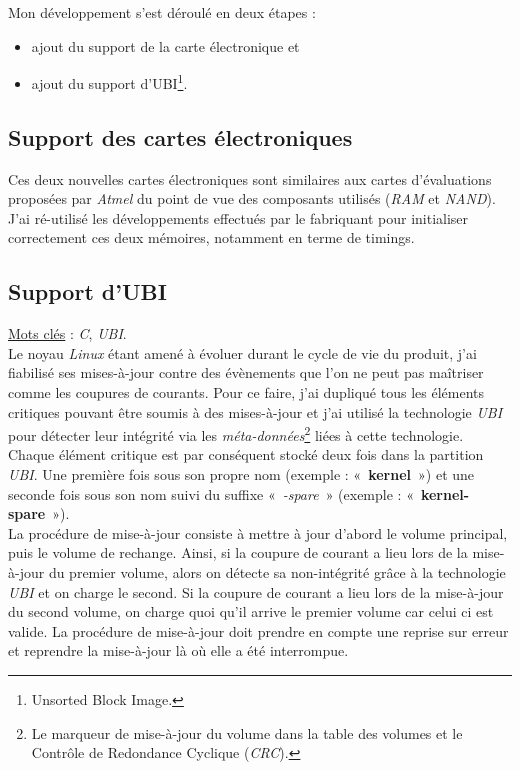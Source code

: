 \documentclass[a4paper]{article}
\begin{document}
Mon développement s'est déroulé en deux étapes :
\begin{itemize}
\item ajout du support de la carte électronique et
\item ajout du support d'UBI\footnote{Unsorted Block Image.}.
\end{itemize}

\subsection{Support des cartes électroniques}

Ces deux nouvelles cartes électroniques sont similaires aux cartes d'évaluations proposées par \textit{Atmel} du point de vue des composants utilisés (\textit{RAM} et \textit{NAND}). J'ai ré-utilisé les développements effectués par le fabriquant pour initialiser correctement ces deux mémoires, notamment en terme de timings.

\subsection{Support d'UBI}

\underline{Mots clés} : \textit{C}, \textit{UBI}.\\

Le noyau \textit{Linux} étant amené à évoluer durant le cycle de vie du produit, j'ai fiabilisé ses mises-à-jour contre des évènements que l'on ne peut pas maîtriser comme les coupures de courants. Pour ce faire, j'ai dupliqué tous les éléments critiques pouvant être soumis à des mises-à-jour et j'ai utilisé la technologie \textit{UBI} pour détecter leur intégrité via les \textit{méta-données}\footnote{Le marqueur de mise-à-jour du volume dans la table des volumes et le Contrôle de Redondance Cyclique (\textit{CRC}).} liées à cette technologie.\\

Chaque élément critique est par conséquent stocké deux fois dans la partition \textit{UBI}. Une première fois sous son propre nom (exemple : «~\textbf{kernel}~») et une seconde fois sous son nom suivi du suffixe «~\textit{-spare}~» (exemple : «~\textbf{kernel-spare}~»).\\

La procédure de mise-à-jour consiste à mettre à jour d'abord le volume principal, puis le volume de rechange. Ainsi, si la coupure de courant a lieu lors de la mise-à-jour du premier volume, alors on détecte sa non-intégrité grâce à la technologie \textit{UBI} et on charge le second. Si la coupure de courant a lieu lors de la mise-à-jour du second volume, on charge quoi qu'il arrive le premier volume car celui ci est valide. La procédure de mise-à-jour doit prendre en compte une reprise sur erreur et reprendre la mise-à-jour là où elle a été interrompue.\\
\end{document}
